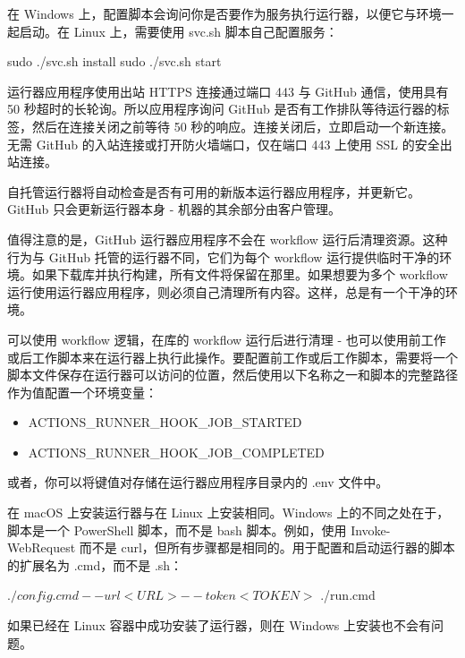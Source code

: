 在 Windows 上，配置脚本会询问你是否要作为服务执行运行器，以便它与环境一起启动。在 Linux 上，需要使用 svc.sh 脚本自己配置服务：

\begin{shell}
sudo ./svc.sh install
sudo ./svc.sh start
\end{shell}


运行器应用程序使用出站 HTTPS 连接通过端口 443 与 GitHub 通信，使用具有 50 秒超时的长轮询。所以应用程序询问 GitHub 是否有工作排队等待运行器的标签，然后在连接关闭之前等待 50 秒的响应。连接关闭后，立即启动一个新连接。无需 GitHub 的入站连接或打开防火墙端口，仅在端口 443 上使用 SSL 的安全出站连接。


自托管运行器将自动检查是否有可用的新版本运行器应用程序，并更新它。GitHub 只会更新运行器本身 - 机器的其余部分由客户管理。


值得注意的是，GitHub 运行器应用程序不会在 workflow 运行后清理资源。这种行为与 GitHub 托管的运行器不同，它们为每个 workflow 运行提供临时干净的环境。如果下载库并执行构建，所有文件将保留在那里。如果想要为多个 workflow 运行使用运行器应用程序，则必须自己清理所有内容。这样，总是有一个干净的环境。

可以使用 workflow 逻辑，在库的 workflow 运行后进行清理 - 也可以使用前工作或后工作脚本来在运行器上执行此操作。要配置前工作或后工作脚本，需要将一个脚本文件保存在运行器可以访问的位置，然后使用以下名称之一和脚本的完整路径作为值配置一个环境变量：

\begin{itemize}
\item 
ACTIONS\_RUNNER\_HOOK\_JOB\_STARTED

\item 
ACTIONS\_RUNNER\_HOOK\_JOB\_COMPLETED
\end{itemize}

或者，你可以将键值对存储在运行器应用程序目录内的 .env 文件中。


在 macOS 上安装运行器与在 Linux 上安装相同。Windows 上的不同之处在于，脚本是一个 PowerShell 脚本，而不是 bash 脚本。例如，使用 Invoke-WebRequest 而不是 curl，但所有步骤都是相同的。用于配置和启动运行器的脚本的扩展名为 .cmd，而不是 .sh：

\begin{shell}
$ ./config.cmd --url <URL> --token <TOKEN>
$ ./run.cmd
\end{shell}

如果已经在 Linux 容器中成功安装了运行器，则在 Windows 上安装也不会有问题。

